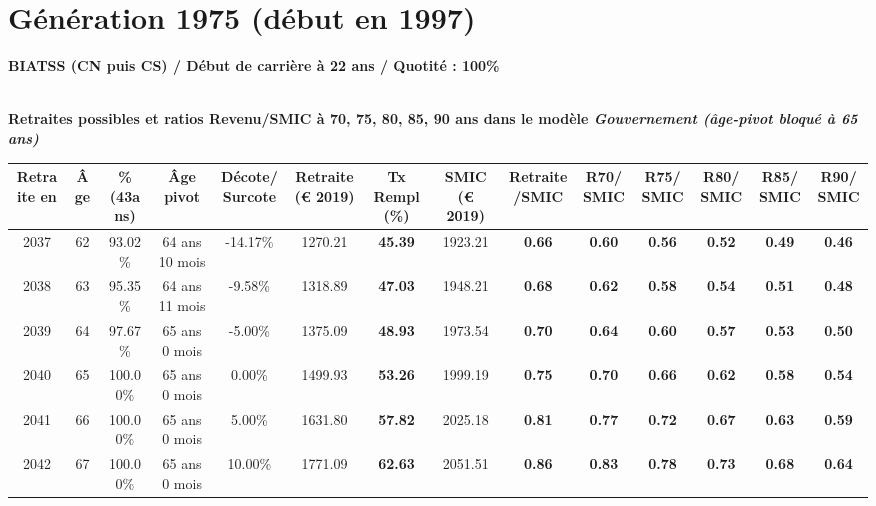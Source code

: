  \newpage 

\section{Génération 1975 (début en 1997)\label{BIATSS_100_1975_22_0}} 
 
{\bf \noindent BIATSS (CN puis CS) / Début de carrière à 22 ans / Quotité : 100\%}  ~ 

 ~\\{\bf \noindent Retraites possibles et ratios Revenu/SMIC à 70, 75, 80, 85, 90 ans dans le modèle \emph{Gouvernement (âge-pivot bloqué à 65 ans)}}  
 
\begin{adjustbox}{max width=\textwidth} 
\begin{tabular}[htb]{|c|c||c|c|c||c|c||c|c||c|c|c|c|c|} 
\hline 
 Retraite en &  Âge &  \%(43ans) &  Âge pivot &  Décote/Surcote &  Retraite (\euro{} 2019) &  Tx Rempl(\%) &  SMIC (\euro{} 2019) &  Retraite/SMIC &  R70/SMIC &  R75/SMIC &  R80/SMIC &  R85/SMIC &  R90/SMIC \\ 
\hline \hline 
 2037 &  62 &  93.02\% &  64 ans 10 mois &  -14.17\% &  1270.21 &  {\bf 45.39} &  1923.21 &  {\bf {\color{red} 0.66}} &  {\bf {\color{red} 0.60}} &  {\bf {\color{red} 0.56}} &  {\bf {\color{red} 0.52}} &  {\bf {\color{red} 0.49}} &  {\bf {\color{red} 0.46}} \\ 
\hline 
 2038 &  63 &  95.35\% &  64 ans 11 mois &  -9.58\% &  1318.89 &  {\bf 47.03} &  1948.21 &  {\bf {\color{red} 0.68}} &  {\bf {\color{red} 0.62}} &  {\bf {\color{red} 0.58}} &  {\bf {\color{red} 0.54}} &  {\bf {\color{red} 0.51}} &  {\bf {\color{red} 0.48}} \\ 
\hline 
 2039 &  64 &  97.67\% &  65 ans 0 mois &  -5.00\% &  1375.09 &  {\bf 48.93} &  1973.54 &  {\bf {\color{red} 0.70}} &  {\bf {\color{red} 0.64}} &  {\bf {\color{red} 0.60}} &  {\bf {\color{red} 0.57}} &  {\bf {\color{red} 0.53}} &  {\bf {\color{red} 0.50}} \\ 
\hline 
 2040 &  65 &  100.00\% &  65 ans 0 mois &  0.00\% &  1499.93 &  {\bf 53.26} &  1999.19 &  {\bf {\color{red} 0.75}} &  {\bf {\color{red} 0.70}} &  {\bf {\color{red} 0.66}} &  {\bf {\color{red} 0.62}} &  {\bf {\color{red} 0.58}} &  {\bf {\color{red} 0.54}} \\ 
\hline 
 2041 &  66 &  100.00\% &  65 ans 0 mois &  5.00\% &  1631.80 &  {\bf 57.82} &  2025.18 &  {\bf {\color{red} 0.81}} &  {\bf {\color{red} 0.77}} &  {\bf {\color{red} 0.72}} &  {\bf {\color{red} 0.67}} &  {\bf {\color{red} 0.63}} &  {\bf {\color{red} 0.59}} \\ 
\hline 
 2042 &  67 &  100.00\% &  65 ans 0 mois &  10.00\% &  1771.09 &  {\bf 62.63} &  2051.51 &  {\bf {\color{red} 0.86}} &  {\bf {\color{red} 0.83}} &  {\bf {\color{red} 0.78}} &  {\bf {\color{red} 0.73}} &  {\bf {\color{red} 0.68}} &  {\bf {\color{red} 0.64}} \\ 
\hline 
\hline 
\end{tabular} 
\end{adjustbox} 
 
